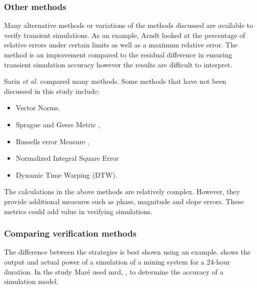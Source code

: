  		\subsubsection{Other methods}
 		Many alternative methods or variations of the methods discussed are available to verify transient simulations. As an example, Arndt \cite{arndt2007integrated} looked at the percentage of relative errors under certain limits as well as a maximum relative error. The method is an improvement compared to the residual difference in ensuring transient simulation accuracy however the results are difficult to interpret.
 		\par
 		Sarin \textit{et al.} \cite{sarin2010comparing} compared many methods. Some methods that have not been discussed in this study include:
 		\begin{itemize}
 			\item Vector Norms.
 			\item Sprague and Geers Metric \cite{Geers1984Objective}, \cite{Sprague2004Spectral}
 			\item Russells error Measure \cite{Russell1}, \cite{Russell2}
 			\item Normalized Integral Square Error
 			\item Dynamic Time Warping (DTW).
 		\end{itemize}
 		The calculations in the above methods are relatively complex. However, they provide additional measures such as phase, magnitude and slope errors. These metrics could add value in verifying simulations.
 		\subsubsection{Comparing verification methods}
 		The difference between the strategies is best shown using an example.  shows the output and actual power of a simulation of a mining system for a 24-hour duration. In the study Maré \cite{Mare2016PhD} used \gls{mrd}, , to determine the accuracy of a simulation model.
 		\par 
 		 
